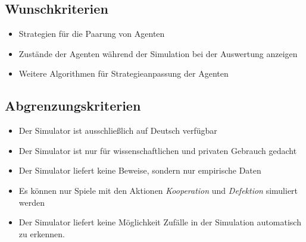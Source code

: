 \subsection{Wunschkriterien}
\begin{itemize}
\item Strategien für die Paarung von Agenten
\item Zustände der Agenten während der Simulation bei der Auswertung anzeigen
\item Weitere Algorithmen für Strategieanpassung der Agenten
\end{itemize}

\subsection{Abgrenzungskriterien}
\begin{itemize}
\item Der Simulator ist ausschließlich auf Deutsch verfügbar
\item Der Simulator ist nur für wissenschaftlichen {\color{red}und privaten} Gebrauch gedacht
\item Der Simulator liefert keine Beweise, sondern nur empirische Daten
\item Es können nur Spiele mit den Aktionen \emph{Kooperation} und \emph{Defektion} simuliert werden
\item Der Simulator liefert keine Möglichkeit Zufälle in der Simulation automatisch zu erkennen.
\end{itemize}